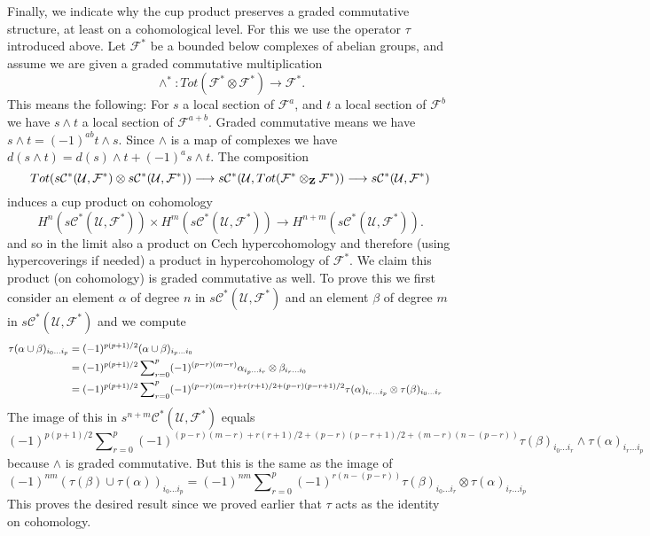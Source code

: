 \medskip\noindent
Finally, we indicate why the cup product preserves
a graded commutative structure, at least on a cohomological level.
For this we use the operator
$\tau$ introduced above. Let ${\mathcal F}^*$ be a bounded below
complexes of abelian groups, and assume we are given
a graded commutative multiplication
$$
\wedge^* : Tot({\mathcal F}^*\otimes {\mathcal F}^*) \to {\mathcal F}^*.
$$
This means the following: For $s$ a local section of
${\mathcal F}^a$, and $t$ a local section of ${\mathcal F}^b$
we have $s \wedge t$ a local section of ${\mathcal F}^{a+b}$.
Graded commutative means we have
$s \wedge t = (-1)^{ab} t \wedge s$. Since $\wedge$ is a map
of complexes we have
$d(s\wedge t) = d(s) \wedge t + (-1)^a s \wedge t$.
The composition
$$
Tot(
s{\mathcal C}^*({\mathcal U},{\mathcal F}^*)
\otimes
s{\mathcal C}^*({\mathcal U},{\mathcal F}^*)
) \longrightarrow
s{\mathcal C}^*({\mathcal U},Tot({\mathcal F}^*\otimes_{\bf Z}{\mathcal F}^*))
\longrightarrow
s{\mathcal C}^*({\mathcal U},{\mathcal F}^*)
$$
induces a cup product on cohomology
$$
H^n(s{\mathcal C}^*({\mathcal U},{\mathcal F}^*))
\times 
H^m(s{\mathcal C}^*({\mathcal U},{\mathcal F}^*))
\longrightarrow
H^{n+m}(s{\mathcal C}^*({\mathcal U},{\mathcal F}^*)).
$$
and so in the limit also a product on Cech hypercohomology
and therefore (using hypercoverings if needed) a product 
in hypercohomology of ${\mathcal F}^*$. We claim this product
(on cohomology) is graded commutative as well. To prove this
we first consider an element $\alpha$ of degree $n$ in
$s{\mathcal C}^*({\mathcal U}, {\mathcal F}^*)$ and an element
$\beta$ of degree $m$ in $s{\mathcal C}^*({\mathcal U}, {\mathcal F}^*)$
and we compute
\begin{align*}
\tau( \alpha \cup \beta )_{i_0\ldots i_p}
& =
(-1)^{p(p+1)/2}
(\alpha \cup \beta)_{i_p\ldots i_0}
\cr
& =
(-1)^{p(p+1)/2}
\sum\nolimits_{r=0}^p
(-1)^{(p-r)(m-r)}
\alpha_{i_p\ldots i_r}\otimes \beta_{i_r\ldots i_0}
\cr
& = 
(-1)^{p(p+1)/2}
\sum\nolimits_{r=0}^p
(-1)^{(p-r)(m-r) + r(r+1)/2 + (p-r)(p-r+1)/2}
\tau(\alpha)_{i_r\ldots i_p}\otimes \tau(\beta)_{i_0\ldots i_r}
\end{align*}
The image of this in $s^{n+m}{\mathcal C}^*({\mathcal U},{\mathcal F}^*)$
equals
$$
(-1)^{p(p+1)/2}
\sum\nolimits_{r=0}^p
(-1)^{(p-r)(m-r) + r(r+1)/2 + (p-r)(p-r+1)/2 + (m-r)(n-(p-r))}
\tau(\beta)_{i_0\ldots i_r} \wedge \tau(\alpha)_{i_r\ldots i_p}
$$
because $\wedge$ is graded commutative. But this is the same
as the image of 
$$
(-1)^{nm}
(\tau(\beta) \cup \tau(\alpha))_{i_0\ldots i_p}
=
(-1)^{nm}
\sum\nolimits_{r=0}^p
(-1)^{r(n-(p-r))}
\tau(\beta)_{i_0\ldots i_r} \otimes \tau(\alpha)_{i_r\ldots i_p}
$$
This proves the desired result since we proved earlier that
$\tau$ acts as the identity on cohomology.


